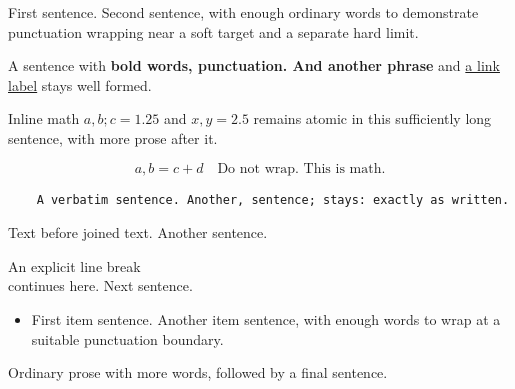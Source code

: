 \documentclass{article}
\begin{document}
First sentence. Second sentence, with enough ordinary words to demonstrate punctuation wrapping near a soft target and a separate hard limit.

A sentence with \textbf{bold words, punctuation. And another phrase} and \href{https://example.test/a,b}{a link label} stays well formed.

Inline math $a, b; c = 1.25$ and \(x, y = 2.5\) remains atomic in this sufficiently long sentence, with more prose after it.

\begin{equation}
  a, b = c + d \quad \text{Do not wrap. This is math.}
\end{equation}

\begin{verbatim}
    A verbatim sentence. Another, sentence; stays: exactly as written.
\end{verbatim}

Text before%
joined text. Another sentence.

An explicit line break\\
continues here. Next sentence.

\begin{itemize}
\item First item sentence. Another item sentence, with enough words to wrap at a suitable punctuation boundary.
\end{itemize}

Ordinary prose with more words, followed by a final sentence.
\end{document}
